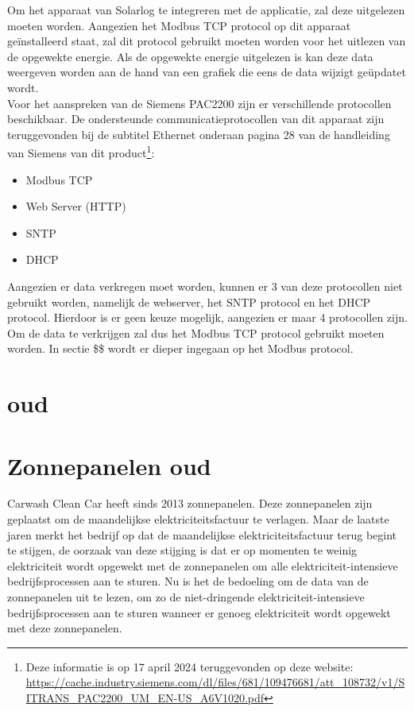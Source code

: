 Om het apparaat van Solarlog te integreren met de applicatie, zal deze uitgelezen moeten worden. Aangezien het Modbus TCP protocol op dit apparaat geïnstalleerd staat, zal dit protocol gebruikt moeten worden voor het uitlezen van de opgewekte energie. Als de opgewekte energie uitgelezen is kan deze data weergeven worden aan de hand van een grafiek die eens de data wijzigt geüpdatet wordt.\\

Voor het aanspreken van de Siemens PAC2200 zijn er verschillende protocollen beschikbaar. De ondersteunde communicatieprotocollen van dit apparaat zijn teruggevonden bij de subtitel Ethernet onderaan pagina 28 van de handleiding van Siemens van dit product\footnote{Deze informatie is op 17 april 2024 teruggevonden op deze website: \url{https://cache.industry.siemens.com/dl/files/681/109476681/att_108732/v1/SITRANS_PAC2200_UM_EN-US_A6V1020.pdf}}:

\begin{itemize}
    \item Modbus TCP
    \item Web Server (HTTP)
    \item SNTP
    \item DHCP
\end{itemize}

Aangezien er data verkregen moet worden, kunnen er 3 van deze protocollen niet gebruikt worden, namelijk de webserver, het SNTP protocol en het DHCP protocol. Hierdoor is er geen keuze mogelijk, aangezien er maar 4 protocollen zijn. Om de data te verkrijgen zal dus het Modbus TCP protocol gebruikt moeten worden. In sectie \$\$ wordt er dieper ingegaan op het Modbus protocol.

\section{oud}
\label{sec:stand-van-zaken-oude}

\section{Zonnepanelen oud}
\label{sec:stand-van-zaken-zonnepanelen-oud}

Carwash Clean Car heeft sinds 2013 zonnepanelen. Deze zonnepanelen zijn geplaatst om de maandelijkse elektriciteitsfactuur te verlagen. Maar de laatste jaren merkt het bedrijf op dat de maandelijkse elektriciteitsfactuur terug begint te stijgen, de oorzaak van deze stijging is dat er op momenten te weinig elektriciteit wordt opgewekt met de zonnepanelen om alle elektriciteit-intensieve bedrijfsprocessen aan te sturen. Nu is het de bedoeling om de data van de zonnepanelen uit te lezen, om zo de niet-dringende elektriciteit-intensieve bedrijfsprocessen aan te sturen wanneer er genoeg elektriciteit wordt opgewekt met deze zonnepanelen.\\

